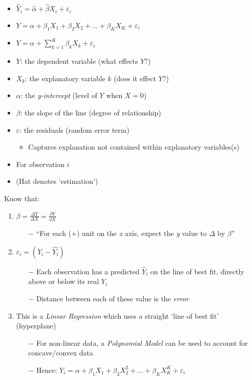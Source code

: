 \documentclass[11pt, english]{article}
\begin{document}
	\begin{itemize}
	\setlength\itemsep{0cm}
		\item $\hat{Y}_i=\hat{\alpha}+\hat{\beta}X_i+\varepsilon_i$
		\item $Y=\alpha+\beta_1X_1+\beta_2X_2+...+\beta_KX_K+\varepsilon_i$
		\item $Y=\alpha+\sum_{k=1}^K\beta_kX_k+\varepsilon_i$
		\item $Y$: the dependent variable (what effects $Y$?)
		\item $X_k$: the explanatory variable $k$ (does it effect $Y$?)
		\item $\alpha$: the \textit{y-intercept} (level of $Y$ when $X=0$)
		\item $\beta$: the slope of the line (degree of relationship)
		\item $\varepsilon$: the residuals (random error term)
		\begin{itemize}
			\item Captures explanation not contained within explanatory variables(s)		
		\end{itemize}
		\item For observation $i$
		\item (Hat denotes `estimation')
	\end{itemize}

	Know that:

	\begin{enumerate}
        \setlength\itemsep{0cm}
		\item $\beta=\frac{\Delta Y}{\Delta X}=\frac{\partial Y}{\partial X}$
		\begin{enumerate}
			\item[$-$] ``For each ($+$) unit on the \textit{x} axis, expect the \textit{y} value to $\Delta$ by $\beta$''
		\end{enumerate}
		\item $\varepsilon_i=(Y_i-\hat{Y_i})$
		\begin{enumerate} 
			\item[$-$] Each observation has a predicted $\hat{Y}_i$ on the line of best fit, directly above or below its real $Y_i$
			\item[$-$] Distance between each of these value is the \textit{error}
		\end{enumerate}
		\item This is a \textit{Linear Regression} which uses a straight `line of best fit' (hyperplane)
		\begin{enumerate}
			\item[$-$] For non-linear data, a \textit{Polynomial Model} can be used to account for concave/convex data 
			\item[$-$] Hence: $Y_i=\alpha+\beta_1X_1+\beta_2X_2^2+...+\beta_KX_K^K+\varepsilon_i$
		\end{enumerate}
	\end{enumerate}
\end{document}

